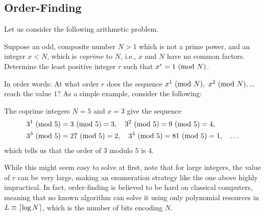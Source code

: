 \subsection{Order-Finding}
Let us consider the following arithmetic problem.
\begin{def*}
Suppose an odd, composite number $N>1$ which is not a prime power, and an integer $x<N$, which is \textit{coprime} to $N$, i.e., $x$ and $N$ have no common factors. Determine the least positive integer $r$ such that ${x^r =1\ (\mathrm{mod}\ N)}$. 
\end{def*}
In order words: At what order $r$ does the sequence ${x^1\Mod{N}},\ {x^2\Mod{N}}, ...$ reach the value $1$? As a simple example, consider the following: 
\begin{ex*}[$N=5$, $x=3$]
The coprime integers $N=5$ and $x=3$ give the sequence
\begin{align*}
 &3^1\ (\mathrm{mod}\ 5)= 3\ (\mathrm{mod}\ 5)= 3,\quad 3^2\ (\mathrm{mod}\ 5)= 9\ (\mathrm{mod}\ 5)= 4,\\
 &3^3\ (\mathrm{mod}\ 5)= 27\ (\mathrm{mod}\ 5)= 2, \quad 3^4\ (\mathrm{mod}\ 5)= 81\ (\mathrm{mod}\ 5)= 1, \quad \dots
\end{align*}
which tells us that the order of $3$ modulo $5$ is $4$. 
\end{ex*}

While this might seem easy to solve at first, note that for large integers, the value of $r$ can be very large, making an enumeration strategy like the one above highly impractical. In fact, order-finding is believed to be hard on classical computers, meaning that no known algorithm can solve it using only polynomial resources in $L\equiv\lceil\log{N}\rceil$, which is the number of bits encoding $N$. 

